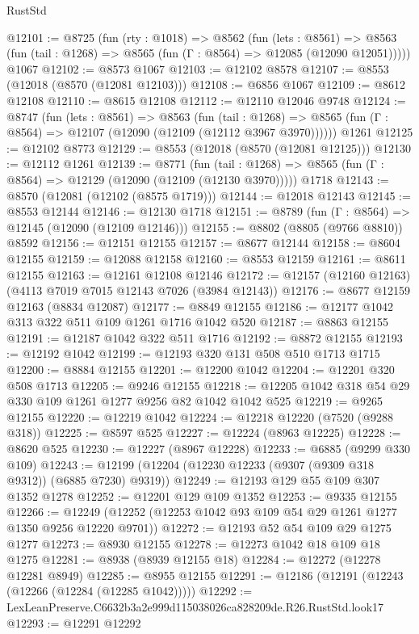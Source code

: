 \begin{lexlean}{RustStd}
\begin{coremodule}
@12101 := @8725
    (fun (rty : @1018) =>
    @8562
      (fun (lets : @8561) =>
      @8563 (fun (tail : @1268) => @8565 (fun (Γ : @8564) => @12085 (@12090 @12051)))))
    @1067
@12102 := @8573 @1067
@12103 := @12102 @8578
@12107 := @8553 (@12018 (@8570 (@12081 @12103)))
@12108 := @6856 @1067
@12109 := @8612 @12108
@12110 := @8615 @12108
@12112 := @12110 @12046 @9748
@12124 := @8747
    (fun (lets : @8561) =>
    @8563
      (fun (tail : @1268) =>
      @8565 (fun (Γ : @8564) => @12107 (@12090 (@12109 (@12112 @3967 @3970))))))
    @1261
@12125 := @12102 @8773
@12129 := @8553 (@12018 (@8570 (@12081 @12125)))
@12130 := @12112 @1261
@12139 := @8771
    (fun (tail : @1268) => @8565 (fun (Γ : @8564) => @12129 (@12090 (@12109 (@12130 @3970)))))
    @1718
@12143 := @8570 (@12081 (@12102 (@8575 @1719)))
@12144 := @12018 @12143
@12145 := @8553 @12144
@12146 := @12130 @1718
@12151 := @8789 (fun (Γ : @8564) => @12145 (@12090 (@12109 @12146)))
@12155 := @8802 (@8805 (@9766 @8810)) @8592
@12156 := @12151 @12155
@12157 := @8677 @12144
@12158 := @8604 @12155
@12159 := @12088 @12158
@12160 := @8553 @12159
@12161 := @8611 @12155
@12163 := @12161 @12108 @12146
@12172 := @12157 (@12160 @12163) (@4113 @7019 @7015 @12143 @7026 (@3984 @12143))
@12176 := @8677 @12159 @12163 (@8834 @12087)
@12177 := @8849 @12155
@12186 := @12177 @1042 @313 @322 @511 @109 @1261 @1716 @1042 @520
@12187 := @8863 @12155
@12191 := @12187 @1042 @322 @511 @1716
@12192 := @8872 @12155
@12193 := @12192 @1042
@12199 := @12193 @320 @131 @508 @510 @1713 @1715
@12200 := @8884 @12155
@12201 := @12200 @1042
@12204 := @12201 @320 @508 @1713
@12205 := @9246 @12155
@12218 := @12205 @1042 @318 @54 @29 @330 @109 @1261 @1277 @9256 @82 @1042 @1042 @525
@12219 := @9265 @12155
@12220 := @12219 @1042
@12224 := @12218 @12220 (@7520 (@9288 @318))
@12225 := @8597 @525
@12227 := @12224 (@8963 @12225)
@12228 := @8620 @525
@12230 := @12227 (@8967 @12228)
@12233 := @6885 (@9299 @330 @109)
@12243 := @12199 (@12204 (@12230 @12233 (@9307 (@9309 @318 @9312)) (@6885 @7230) @9319))
@12249 := @12193 @129 @55 @109 @307 @1352 @1278
@12252 := @12201 @129 @109 @1352
@12253 := @9335 @12155
@12266 := @12249 (@12252 (@12253 @1042 @93 @109 @54 @29 @1261 @1277 @1350 @9256 @12220 @9701))
@12272 := @12193 @52 @54 @109 @29 @1275 @1277
@12273 := @8930 @12155
@12278 := @12273 @1042 @18 @109 @18 @1275
@12281 := @8938 (@8939 @12155 @18)
@12284 := @12272 (@12278 @12281 @8949)
@12285 := @8955 @12155
@12291 := @12186 (@12191 (@12243 (@12266 (@12284 (@12285 @1042)))))
@12292 := LexLeanPreserve.C6632b3a2e999d115038026ca828209de.R26.RustStd.look17
@12293 := @12291 @12292

\end{coremodule}
\end{lexlean}
